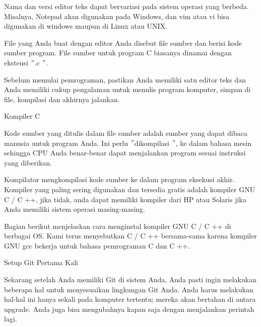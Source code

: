 \vspace{12pt}
\noindent 
Nama dan versi editor teks dapat bervariasi pada sistem operasi yang berbeda. Misalnya, Notepad akan digunakan pada Windows, dan vim atau vi bisa digunakan di windows maupun di Linux atau UNIX. \par
\vspace{12pt}
\noindent 
File yang Anda buat dengan editor Anda disebut file sumber dan berisi kode sumber program. File sumber untuk program C biasanya dinamai dengan ekstensi  $ " $.c $ " $. \par
\vspace{12pt}
\noindent 
Sebelum memulai pemrograman, pastikan Anda memiliki satu editor teks dan Anda memiliki cukup pengalaman untuk menulis program komputer, simpan di file, kompilasi dan akhirnya jalankan. \par
\vspace{12pt}
\noindent 
Kompiler C \par
\vspace{12pt}
\noindent 
Kode sumber yang ditulis dalam file sumber adalah sumber yang dapat dibaca manusia untuk program Anda. Ini perlu  $ " $dikompilasi $ " $, ke dalam bahasa mesin sehingga CPU Anda benar-benar dapat menjalankan program sesuai instruksi yang diberikan. \par
\vspace{12pt}
\noindent 
Kompilator mengkompilasi kode sumber ke dalam program eksekusi akhir. Kompiler yang paling sering digunakan dan tersedia gratis adalah kompiler GNU C / C ++, jika tidak, anda dapat memiliki kompiler dari HP atau Solaris jika Anda memiliki sistem operasi masing-masing. \par
\vspace{12pt}
\noindent 
Bagian berikut menjelaskan cara menginstal kompiler GNU C / C ++ di berbagai OS. Kami terus menyebutkan C / C ++ bersama-sama karena kompiler GNU gcc bekerja untuk bahasa pemrograman C dan C ++. \par
\noindent 
Setup Git Pertama Kali \par
\vspace{12pt}
\noindent 
Sekarang setelah Anda memiliki Git di sistem Anda, Anda pasti ingin melakukan beberapa hal untuk menyesuaikan lingkungan Git Anda. $  $Anda harus melakukan hal-hal ini hanya sekali pada komputer tertentu; $  $mereka akan bertahan di antara upgrade. $  $Anda juga bisa mengubahnya kapan saja dengan menjalankan perintah lagi. \par
\vspace{12pt}
